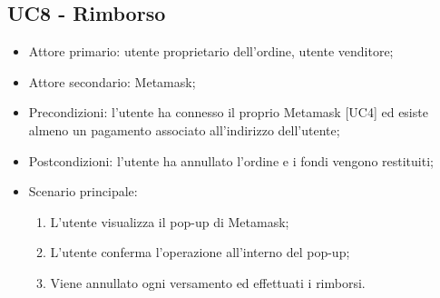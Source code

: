 \subsection{UC8 - Rimborso}

\begin{itemize}
    \item Attore primario: utente proprietario dell'ordine, utente venditore;
    \item Attore secondario: Metamask\glo{};
    \item Precondizioni: l'utente ha connesso il proprio Metamask\glo{} [UC4] ed esiste almeno un pagamento associato all'indirizzo dell'utente;
    \item Postcondizioni: l'utente ha annullato l'ordine e i fondi vengono restituiti;
    \item Scenario principale:
          \begin{enumerate}
              \item L'utente visualizza il pop-up di Metamask\glo{};
              \item L'utente conferma l'operazione all'interno del pop-up;
              \item Viene annullato ogni versamento ed effettuati i rimborsi.
          \end{enumerate}
\end{itemize}

\clearpage
